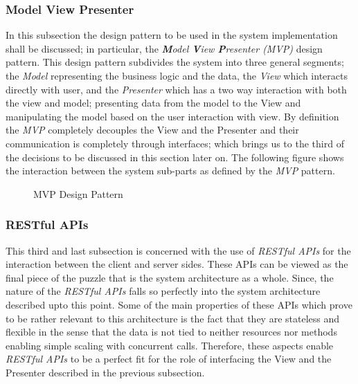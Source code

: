 \subsubsection{Model View Presenter}
In this subsection the design pattern to be used in the system implementation shall be discussed; in particular, the \emph{\textbf{M}odel \textbf{V}iew \textbf{P}resenter (MVP)} design pattern. This design pattern subdivides the system into three general segments; the \emph{Model} representing the business logic and the data, the \emph{View} which interacts directly with user, and the \emph{Presenter} which has a two way interaction with both the view and model; presenting data from the model to the View and manipulating the model based on the user interaction with view. By definition the \emph{MVP} completely decouples the View and the Presenter and their communication is completely through interfaces; which brings us to the third of the decisions to be discussed in this section later on. The following figure shows the interaction between the system sub-parts as defined by the \emph{MVP} pattern.

\begin{figure}[H]
\caption{MVP Design Pattern}
\label{fig:MVP-desgn-patt}
\centering

\end{figure}

\subsubsection{RESTful APIs}
This third and last subsection is concerned with the use of \emph{RESTful APIs} for the interaction between the client and server sides. These APIs can be viewed as the final piece of the puzzle that is the system architecture as a whole. Since, the nature of the \emph{RESTful APIs} falls so perfectly into the system architecture described upto this point. Some of the main properties of these APIs which prove to be rather relevant to this architecture is the fact that they are stateless and flexible in the sense that the data is not tied to neither resources nor methods enabling simple scaling with concurrent calls. Therefore, these aspects enable \emph{RESTful APIs} to be a perfect fit for the role of interfacing the View and the Presenter described in the previous subsection. 